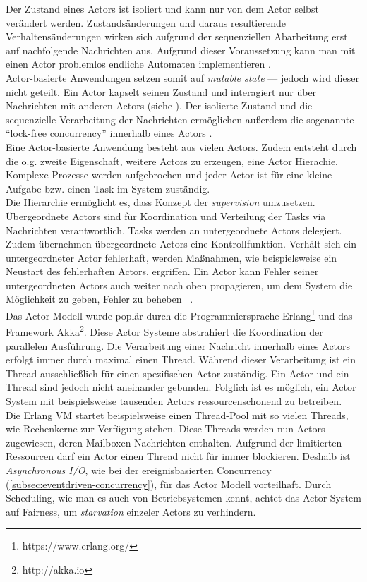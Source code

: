 Der Zustand eines Actors ist isoliert und kann nur von dem Actor selbst verändert werden. Zustandsänderungen und daraus resultierende Verhaltensänderungen wirken sich aufgrund der sequenziellen Abarbeitung erst auf nachfolgende Nachrichten aus. Aufgrund dieser Voraussetzung kann man mit einen Actor problemlos endliche Automaten implementieren \cite[S.~14]{vernon_reactive_2016} \cite[S.~84]{kuhn_reactive_2015}.\\
Actor-basierte Anwendungen setzen somit auf \textit{mutable state} --- jedoch wird dieser nicht geteilt. Ein Actor kapselt seinen Zustand und interagiert nur über Nachrichten mit anderen Actors (siehe ). Der isolierte Zustand und die sequenzielle Verarbeitung der Nachrichten ermöglichen außerdem die sogenannte \enquote{lock-free concurrency} innerhalb eines Actors \cite[S.~85]{kuhn_reactive_2015}.\\
Eine Actor-basierte Anwendung besteht aus vielen Actors. Zudem entsteht durch die o.g. zweite Eigenschaft, weitere Actors zu erzeugen, eine Actor Hierachie. Komplexe Prozesse werden aufgebrochen und jeder Actor ist für eine kleine Aufgabe bzw. einen Task im System zuständig.\\
Die Hierarchie ermöglicht es, dass Konzept der \textit{supervision} umzusetzen. Übergeordnete Actors sind für Koordination und Verteilung der Tasks via Nachrichten verantwortlich. Tasks werden an untergeordnete Actors delegiert. Zudem übernehmen übergeordnete Actors eine Kontrollfunktion. Verhält sich ein untergeordneter Actor fehlerhaft, werden Maßnahmen, wie beispielsweise ein Neustart des fehlerhaften Actors, ergriffen. Ein Actor kann Fehler seiner untergeordneten Actors auch weiter nach oben propagieren, um dem System die Möglichkeit zu geben, Fehler zu beheben~\cite[S.~15]{vernon_reactive_2016} \cite[S.~83]{kuhn_reactive_2015} \cite[S.~86]{erb_concurrent_2012}.\\

Das Actor Modell wurde poplär durch die Programmiersprache Erlang\footnote{https://www.erlang.org/} und das Framework Akka\footnote{http://akka.io}. Diese Actor Systeme abstrahiert die Koordination der parallelen Ausführung. Die Verarbeitung einer Nachricht innerhalb eines Actors erfolgt immer durch maximal einen Thread. Während dieser Verarbeitung ist ein Thread ausschließlich für einen spezifischen Actor zuständig. Ein Actor und ein Thread sind jedoch nicht aneinander gebunden. Folglich ist es möglich, ein Actor System mit beispielsweise tausenden Actors ressourcenschonend zu betreiben.\\
Die Erlang VM startet beispielsweise einen Thread-Pool mit so vielen Threads, wie Rechenkerne zur Verfügung stehen. Diese Threads werden nun Actors zugewiesen, deren Mailboxen Nachrichten enthalten. Aufgrund der limitierten Ressourcen darf ein Actor einen Thread nicht für immer blockieren. Deshalb ist \textit{Asynchronous I/O}, wie bei der ereignisbasierten Concurrency (\ref{subsec:eventdriven-concurrency}), für das Actor Modell vorteilhaft. Durch Scheduling, wie man es auch von Betriebsystemen kennt, achtet das Actor System auf Fairness, um \textit{starvation} einzeler Actors zu verhindern.\\

